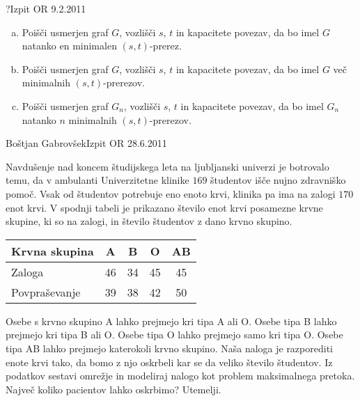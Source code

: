 \begin{naloga}{?}{Izpit OR 9.2.2011}
\begin{vprasanje}[minprerezi]
\begin{enumerate}[(a)]
\item Poišči usmerjen graf $G$, vozlišči $s$, $t$ in kapacitete povezav,
da bo imel $G$ natanko en minimalen $(s, t)$-prerez.

\item Poišči usmerjen graf $G$, vozlišči $s$, $t$ in kapacitete povezav,
da bo imel $G$ več minimalnih $(s, t)$-prerezov.

\item Poišči usmerjen graf $G_n$, vozlišči $s$, $t$ in kapacitete povezav,
da bo imel $G_n$ natanko $n$ minimalnih $(s, t)$-prerezov.
\end{enumerate}
\end{vprasanje}
\begin{odgovor}
\end{odgovor}
\end{naloga}


\begin{naloga}{Boštjan Gabrovšek}{Izpit OR 28.6.2011}
\begin{vprasanje}[kri]
Navdušenje nad koncem študijskega leta na ljubljanski univerzi
je botrovalo temu,
da v ambulanti Univerzitetne klinike
$169$ študentov išče nujno zdravniško pomoč.
Vsak od študentov potrebuje eno enoto krvi,
klinika pa ima na zalogi $170$ enot krvi.
V spodnji tabeli je prikazano število enot krvi posamezne krvne skupine,
ki so na zalogi,
in število študentov z dano krvno skupino.
\begin{center}
\begin{tabular}{l|cccc}
Krvna skupina &  A &  B &  O & AB \\ \hline
Zaloga        & 46 & 34 & 45 & 45 \\
Povpraševanje & 39 & 38 & 42 & 50
\end{tabular}
\end{center}
Osebe s krvno skupino A lahko prejmejo kri tipa A ali O.
Osebe tipa B lahko prejmejo kri tipa B ali O.
Osebe tipa O lahko prejmejo samo kri tipa O.
Osebe tipa AB lahko prejmejo katerokoli krvno skupino.
Naša naloga je razporediti enote krvi tako,
da bomo z njo oskrbeli kar se da veliko število študentov.
Iz podatkov sestavi omrežje
in modeliraj nalogo kot problem maksimalnega pretoka.
Največ koliko pacientov lahko oskrbimo?
Utemelji.
\end{vprasanje}
\begin{odgovor}
\end{odgovor}
\end{naloga}



